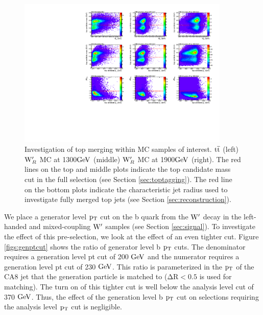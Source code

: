 \begin{figure}[htcb]
\centering
\includegraphics[width=0.9\textwidth]{AN-13-004/figs/topmerge.pdf}
\caption{Investigation of top merging within MC samples of interest.  $\mathrm{t\overline{t}}$ (left) $\mathrm{W}^\prime_R$ MC at 1300$\mathrm{GeV}$ (middle) $\mathrm{W}^\prime_R$ MC at 1900$\mathrm{GeV}$ (right).  The red lines on the top and middle plots indicate the top candidate mass cut in the full selection (see Section \ref{sec:toptagging}).  The red line on the bottom plots indicate the characteristic jet radius used to investigate fully merged top jets (see Section \ref{sec:reconstruction}).}
\label{figs:topmerge}
\end{figure}

We place a generator level $\mathrm{p_{T}}$ cut on the b quark from the $\mathrm{W}^\prime$ decay in the left-handed and mixed-coupling $\mathrm{W}^\prime$ samples (see Section \ref{sec:signal}).  
To investigate the effect of this pre-selection, we look at the effect of an even tighter cut.  
Figure \ref{figs:genptcut} shows the ratio of generator level b $\mathrm{p_{T}}$ cuts.  
The denominator requires a generation level pt cut of 200 $\mathrm{GeV}$ and the numerator requires a generation level pt cut of 230 $\mathrm{GeV}$.  
This ratio is parameterized in the $\mathrm{p_{T}}$ of the CA8 jet that the generation particle is matched to ($\mathrm{\Delta R  < 0.5}$ is used for matching).
The turn on of this tighter cut is well below the analysis level cut of 370$~\mathrm{GeV}$.  Thus, the effect of the generation level b $\mathrm{p_{T}}$ cut 
on selections requiring the analysis level $\mathrm{p_{T}}$ cut is negligible.  

